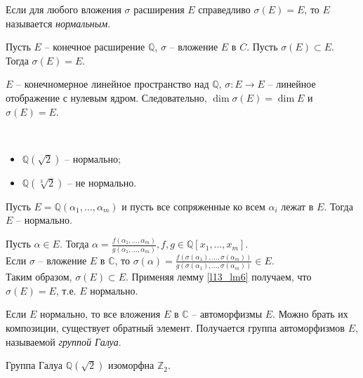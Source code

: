 \begin{definition}
	Если для любого вложения $\sigma$ расширения $E$ справедливо $\sigma(E) = E$, то $E$ называется \textit{нормальным}.
\end{definition}

\begin{lemma} \label{l13_lm6}
	Пусть $E$ -- конечное расширение $\mathbb{Q}$, $\sigma$ -- вложение $E$ в $C$. Пусть $\sigma(E) \subset E$. Тогда $\sigma(E) = E$.
\end{lemma}

\begin{pf}
	$E$ -- конечномерное линейное пространство над $\mathbb{Q}$, $\sigma: E \rightarrow E$ -- линейное отображение с нулевым ядром. Следовательно, $\dim \sigma(E) = \dim E$ и $\sigma(E) = E$.
\end{pf}

\begin{example}~\
	\begin{itemize}[nolistsep]
		\item $\mathbb{Q}(\sqrt{2})$ -- нормально;
		\item $\mathbb{Q}(\sqrt[3]{2})$ -- не нормально.
	\end{itemize}
\end{example}

\begin{theorem} \label{l13_th8}
	Пусть $E = \mathbb{Q}(\alpha_1, \ldots, \alpha_m)$ и пусть все сопряженные ко всем $\alpha_i$ лежат в $E$. Тогда $E$ -- нормально.
\end{theorem}
\begin{pf}
	Пусть $\alpha \in E$. Тогда $\alpha = \frac{f(\alpha_1, \ldots, \alpha_m)}{g(\alpha_1, \ldots, \alpha_m)}, f, g \in \mathbb{Q}[x_1, \ldots, x_m]$.\\
	Если $\sigma$ -- вложение $E$ в $\mathbb{C}$, то $\sigma(\alpha) = \frac{f(\sigma(\alpha_1), \ldots, \sigma(\alpha_m))}{g(\sigma(\alpha_1), \ldots, \sigma(\alpha_m))} \in E$.\\
	Таким образом, $\sigma(E) \subset E$. Применяя лемму \ref{l13_lm6} получаем, что $\sigma(E) = E$, т.е. $E$ нормально.
\end{pf}

Если $E$ нормально, то все вложения $E$ в $\mathbb{C}$ -- автоморфизмы $E$. Можно брать их композиции, существует обратный элемент. Получается группа автоморфизмов $E$, называемой \textit{группой Галуа}.
\begin{example}
	Группа Галуа $\mathbb{Q}(\sqrt{2})$ изоморфна $\mathbb{Z}_2$.
\end{example}


